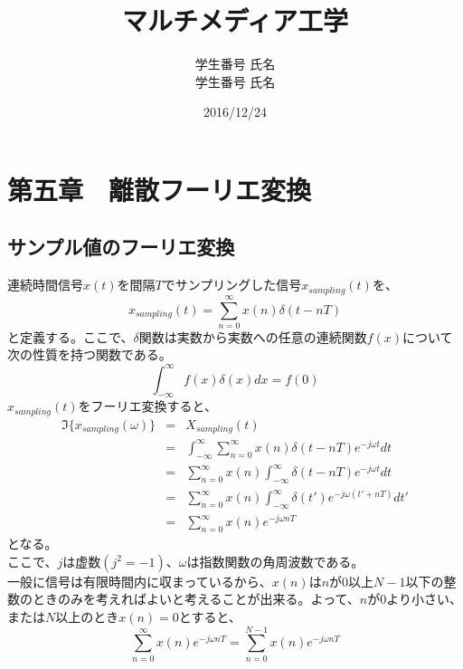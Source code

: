 \documentclass[a4paper]{jsarticle}
\title{マルチメディア工学}
\author{学生番号 氏名 \\ 学生番号 氏名}
\date{2016/12/24}
\begin{document}
\maketitle
\section{第五章　離散フーリエ変換}
\subsection{サンプル値のフーリエ変換}
連続時間信号$x\left(t\right)$を間隔$T$でサンプリングした信号$x_{sampling} \left( t \right)$を、
\begin{equation}
x_{sampling} \left( t \right) = \sum_{n=0}^{ \infty } x \left( n\right) \delta \left( t-nT \right)
\end{equation}
と定義する。ここで、$\delta$関数は実数から実数への任意の連続関数$f \left( x \right)$について次の性質を持つ関数である。
\begin{equation}
\int_{- \infty }^{ \infty } f \left( x \right) \delta \left( x \right) dx = f \left( 0 \right)
\end{equation}
$x_{sampling} \left( t \right)$をフーリエ変換すると、
\begin{eqnarray}
	\mathfrak{I} \bigl\{ x_{sampling} \left( \omega \right) \bigr\} &=& X_{sampling} \left( t \right) \nonumber \\
	&=& \int _{ - \infty } ^{ \infty } \sum _{ n = 0 } ^{ \infty } x \left( n \right) \delta \left( t-nT \right) e ^ { -j \omega t } dt \nonumber \\
	&=& \sum _{ n = 0 } ^{ \infty } x \left( n \right) \int_{- \infty } ^{ \infty} \delta \left( t-nT \right) e ^{ -j \omega t } dt \nonumber \\
	&=& \sum _{ n = 0 } ^{ \infty } x \left( n \right) \int_{- \infty } ^{ \infty} \delta \left( t' \right) e ^{ -j \omega \left( t' + nT \right) } dt' \nonumber \\
	&=& \sum _{ n = 0 } ^{ \infty } x \left( n \right) e ^ { -j \omega nT }
\end{eqnarray}
となる。\\
ここで、$j$は虚数$ \left( j^2 = -1 \right)$、$\omega$は指数関数の角周波数である。\\
一般に信号は有限時間内に収まっているから、$x \left( n \right)$は$n$が$0$以上$N-1$以下の整数のときのみを考えればよいと考えることが出来る。よって、$n$が$0$より小さい、または$N$以上のとき$x \left( n \right) = 0$とすると、
\begin{equation}
\sum _{ n = 0 } ^{ \infty } x \left( n \right) e ^ { -j \omega nT } = \sum _{ n = 0 } ^{ N - 1 } x \left( n \right) e ^ { -j \omega nT }
\end{equation}
\end{document}
